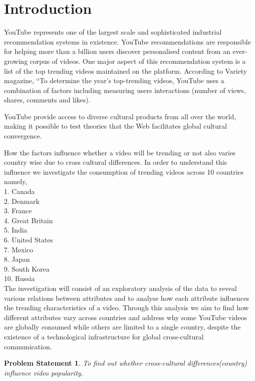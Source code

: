 \documentclass[runningheads]{llncs}
\newtheorem*{myProbStatement}{Problem Statement}
\begin{document}
\section{Introduction}
YouTube represents one of the largest scale and sophisticated industrial recommendation systems in existence. 
YouTube recommendations are responsible for helping more than a billion users discover personalised content from an ever-growing corpus of videos. 
One major aspect of this recommendation system is a list of the top trending videos maintained on the platform. 
According to Variety magazine, “To determine the year’s top-trending videos, YouTube uses a combination of factors including measuring users interactions (number of views, shares, comments and likes). 

YouTube provide access to diverse cultural products from all over the world, making it possible to test theories that the Web facilitates global cultural convergence.

How the factors influence whether a video will be trending or not also varies country wise due to cross cultural differences.
In order to understand this influence we investigate the consumption of trending videos across 10 countries namely,
\\1. Canada
\\2. Denmark
\\3. France
\\4. Great Britain
\\5. India
\\6. United States
\\7. Mexico
\\8. Japan
\\9. South Korea
\\10. Russia
\\ 

The investigation will consist of an exploratory analysis of the data to reveal various relations between attributes and to analyse how each attribute influences the trending characteristics of a video.
Through this analysis we aim to find how different attributes vary across countries and address why some YouTube videos are globally consumed while others are limited to a single country, despite the existence of a technological infrastructure for global cross-cultural communication.


\begin{myProbStatement}
To find out whether cross-cultural differences(country) influence video popularity.
\end{myProbStatement}
%
%
\end{document}
